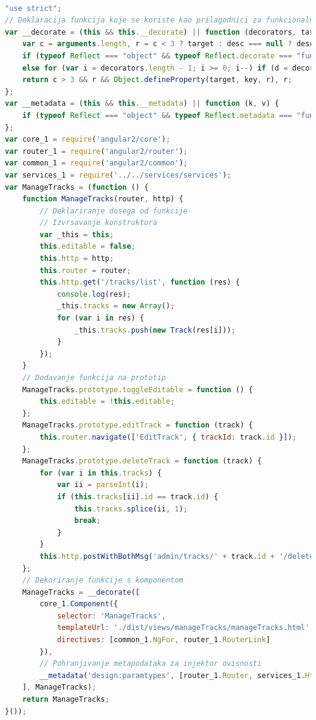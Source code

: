 \documentclass[times, utf8, zavrsni]{fer}
\begin{document}
\begin{lstlisting}[language=JavaScript, basicstyle=\small\linespread{0.8}]

"use strict";
// Deklaracija funkcija koje se koriste kao prilagodnici za funkcionalnosti dekoriranja i pohrane metapodataka
var __decorate = (this && this.__decorate) || function (decorators, target, key, desc) {
    var c = arguments.length, r = c < 3 ? target : desc === null ? desc = Object.getOwnPropertyDescriptor(target, key) : desc, d;
    if (typeof Reflect === "object" && typeof Reflect.decorate === "function") r = Reflect.decorate(decorators, target, key, desc);
    else for (var i = decorators.length - 1; i >= 0; i--) if (d = decorators[i]) r = (c < 3 ? d(r) : c > 3 ? d(target, key, r) : d(target, key)) || r;
    return c > 3 && r && Object.defineProperty(target, key, r), r;
};
var __metadata = (this && this.__metadata) || function (k, v) {
    if (typeof Reflect === "object" && typeof Reflect.metadata === "function") return Reflect.metadata(k, v);
};
var core_1 = require('angular2/core');
var router_1 = require('angular2/router');
var common_1 = require('angular2/common');
var services_1 = require('../../services/services');
var ManageTracks = (function () {
    function ManageTracks(router, http) {
    	// Deklariranje dosega od funkcije
        // Izvrsavanje konstruktora
        var _this = this;
        this.editable = false;
        this.http = http;
        this.router = router;
        this.http.get('/tracks/list', function (res) {
            console.log(res);
            _this.tracks = new Array();
            for (var i in res) {
                _this.tracks.push(new Track(res[i]));
            }
        });
    }
    // Dodavanje funkcija na prototip
    ManageTracks.prototype.toggleEditable = function () {
        this.editable = !this.editable;
    };
    ManageTracks.prototype.editTrack = function (track) {
        this.router.navigate(['EditTrack', { trackId: track.id }]);
    };
    ManageTracks.prototype.deleteTrack = function (track) {
        for (var i in this.tracks) {
            var ii = parseInt(i);
            if (this.tracks[ii].id == track.id) {
                this.tracks.splice(ii, 1);
                break;
            }
        }
        this.http.postWithBothMsg('admin/tracks/' + track.id + '/delete', '');
    };
    // Dekoriranje funkcije s komponentom
    ManageTracks = __decorate([
        core_1.Component({
            selector: 'ManageTracks',
            templateUrl: './dist/views/manageTracks/manageTracks.html',
            directives: [common_1.NgFor, router_1.RouterLink]
        }), 
        // Pohranjivanje metapodataka za injektor ovisnosti
        __metadata('design:paramtypes', [router_1.Router, services_1.HttpAdvanced])
    ], ManageTracks);
    return ManageTracks;
}());


\end{lstlisting}
\end{document}
